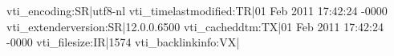 vti_encoding:SR|utf8-nl
vti_timelastmodified:TR|01 Feb 2011 17:42:24 -0000
vti_extenderversion:SR|12.0.0.6500
vti_cacheddtm:TX|01 Feb 2011 17:42:24 -0000
vti_filesize:IR|1574
vti_backlinkinfo:VX|
